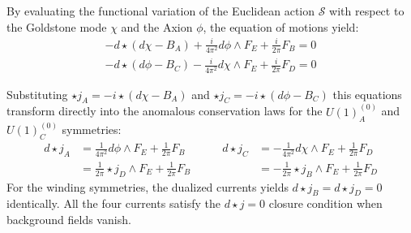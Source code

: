 \documentclass[aps,preprint,nofootinbib,preprintnumbers,eqsecnum,superscriptaddress]{revtex4}
\numberwithin{equation}{section}
\begin{document}
By evaluating the functional variation of the Euclidean action $\mathcal{S}$ with respect to the Goldstone mode $\chi$ and the Axion $\phi$, the equation of motions yield:
\begin{align}
    -d\star(d\chi - B_A) + \frac{i}{4\pi^2}d\phi\wedge F_E + \frac{i}{2\pi}F_B = 0 \\
    -d\star(d\phi - B_C) - \frac{i}{4\pi^2}d\chi \wedge F_E + \frac{i}{2\pi}F_D = 0
\end{align}

Substituting $\star j_A = -i \star(d\chi - B_A)$ and $\star j_C = -i \star(d\phi - B_C)$ this equations transform directly into the anomalous conservation laws for the $U(1)^{(0)}_A$ and $U(1)^{(0)}_C$ symmetries:
\begin{align}\label{eq:superfluid_topo_cons_eq}
    d\star j_A &= \frac{1}{4\pi^2}d\phi \wedge F_E + \frac{1}{2\pi}F_B \qquad 
    & d\star j_C &= -\frac{1}{4\pi^2}d\chi \wedge F_E + \frac{1}{2\pi}F_D
    \\
    &= \frac{1}{2\pi} \star j_D\wedge F_E + \frac{1}{2\pi}F_B \qquad 
    & &= -\frac{1}{2\pi} \star j_B\wedge F_E + \frac{1}{2\pi}F_D 
\end{align}
For the winding symmetries, the dualized currents yields $d\star j_B = d\star j_D  = 0$ identically. All the four currents satisfy the $d\star j = 0$ closure condition when background fields vanish.
\end{document}
